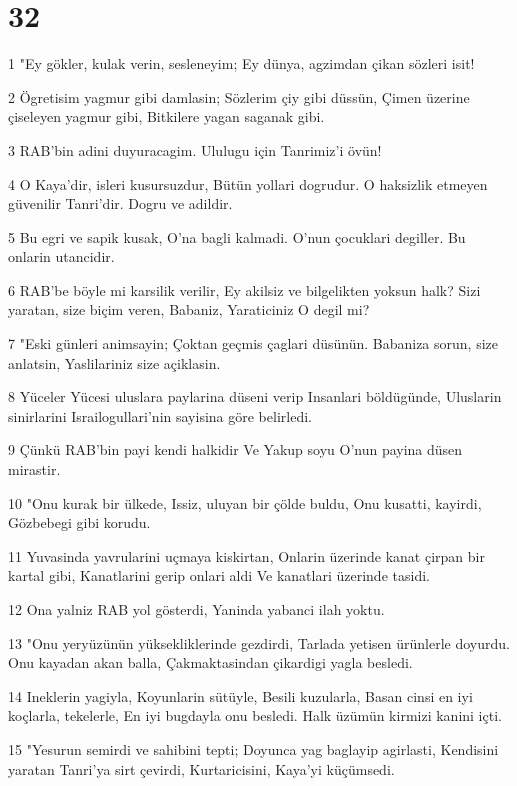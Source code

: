 \chapter{32}

\par 1 "Ey gökler, kulak verin, sesleneyim; Ey dünya, agzimdan çikan sözleri isit!
\par 2 Ögretisim yagmur gibi damlasin; Sözlerim çiy gibi düssün, Çimen üzerine çiseleyen yagmur gibi, Bitkilere yagan saganak gibi.
\par 3 RAB'bin adini duyuracagim. Ululugu için Tanrimiz'i övün!
\par 4 O Kaya'dir, isleri kusursuzdur, Bütün yollari dogrudur. O haksizlik etmeyen güvenilir Tanri'dir. Dogru ve adildir.
\par 5 Bu egri ve sapik kusak, O'na bagli kalmadi. O'nun çocuklari degiller. Bu onlarin utancidir.
\par 6 RAB'be böyle mi karsilik verilir, Ey akilsiz ve bilgelikten yoksun halk? Sizi yaratan, size biçim veren, Babaniz, Yaraticiniz O degil mi?
\par 7 "Eski günleri animsayin; Çoktan geçmis çaglari düsünün. Babaniza sorun, size anlatsin, Yaslilariniz size açiklasin.
\par 8 Yüceler Yücesi uluslara paylarina düseni verip Insanlari böldügünde, Uluslarin sinirlarini Israilogullari'nin sayisina göre belirledi.
\par 9 Çünkü RAB'bin payi kendi halkidir Ve Yakup soyu O'nun payina düsen mirastir.
\par 10 "Onu kurak bir ülkede, Issiz, uluyan bir çölde buldu, Onu kusatti, kayirdi, Gözbebegi gibi korudu.
\par 11 Yuvasinda yavrularini uçmaya kiskirtan, Onlarin üzerinde kanat çirpan bir kartal gibi, Kanatlarini gerip onlari aldi Ve kanatlari üzerinde tasidi.
\par 12 Ona yalniz RAB yol gösterdi, Yaninda yabanci ilah yoktu.
\par 13 "Onu yeryüzünün yüksekliklerinde gezdirdi, Tarlada yetisen ürünlerle doyurdu. Onu kayadan akan balla, Çakmaktasindan çikardigi yagla besledi.
\par 14 Ineklerin yagiyla, Koyunlarin sütüyle, Besili kuzularla, Basan cinsi en iyi koçlarla, tekelerle, En iyi bugdayla onu besledi. Halk üzümün kirmizi kanini içti.
\par 15 "Yesurun semirdi ve sahibini tepti; Doyunca yag baglayip agirlasti, Kendisini yaratan Tanri'ya sirt çevirdi, Kurtaricisini, Kaya'yi küçümsedi.
